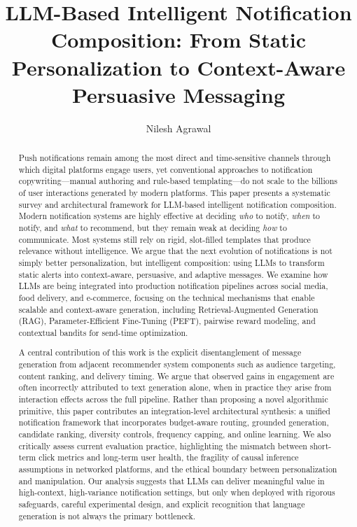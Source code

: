 \documentclass[sigconf]{acmart}
\begin{document}
\title{LLM-Based Intelligent Notification Composition: From Static Personalization to Context-Aware Persuasive Messaging}

\author{Nilesh Agrawal}

\renewcommand{\shortauthors}{}
\fancyhead{} %

\begin{abstract}
Push notifications remain among the most direct and time-sensitive channels through which digital platforms engage users, yet conventional approaches to notification copywriting---manual authoring and rule-based templating---do not scale to the billions of user interactions generated by modern platforms. This paper presents a systematic survey and architectural framework for LLM-based intelligent notification composition. Modern notification systems are highly effective at deciding \textit{who} to notify, \textit{when} to notify, and \textit{what} to recommend, but they remain weak at deciding \textit{how} to communicate. Most systems still rely on rigid, slot-filled templates that produce relevance without intelligence. We argue that the next evolution of notifications is not simply better personalization, but intelligent composition: using LLMs to transform static alerts into context-aware, persuasive, and adaptive messages. We examine how LLMs are being integrated into production notification pipelines across social media, food delivery, and e-commerce, focusing on the technical mechanisms that enable scalable and context-aware generation, including Retrieval-Augmented Generation (RAG), Parameter-Efficient Fine-Tuning (PEFT), pairwise reward modeling, and contextual bandits for send-time optimization.

A central contribution of this work is the explicit disentanglement of message generation from adjacent recommender system components such as audience targeting, content ranking, and delivery timing. We argue that observed gains in engagement are often incorrectly attributed to text generation alone, when in practice they arise from interaction effects across the full pipeline. Rather than proposing a novel algorithmic primitive, this paper contributes an integration-level architectural synthesis: a unified notification framework that incorporates budget-aware routing, grounded generation, candidate ranking, diversity controls, frequency capping, and online learning. We also critically assess current evaluation practice, highlighting the mismatch between short-term click metrics and long-term user health, the fragility of causal inference assumptions in networked platforms, and the ethical boundary between personalization and manipulation. Our analysis suggests that LLMs can deliver meaningful value in high-context, high-variance notification settings, but only when deployed with rigorous safeguards, careful experimental design, and explicit recognition that language generation is not always the primary bottleneck.
\end{abstract}
\end{document}
